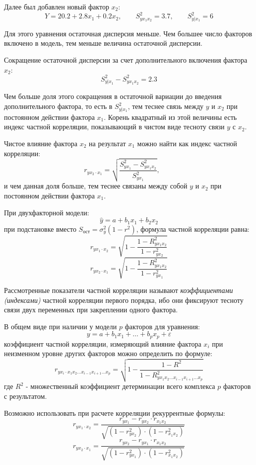 \documentclass[aps,%
12pt,%
final,%
oneside,
onecolumn,%
musixtex, %
superscriptaddress,%
centertags]{article} %
\theoremstyle{plain}
\theoremstyle{definition}
\theoremstyle{remark}
\begin{document}
Далее был добавлен новый фактор $x_2$:
$$ Y = 20.2 +2.8x_1+ 0.2x_2,\qquad S_{yx_1x_2}^2 = 3.7, \qquad S_{y|x_1}^2 = 6$$

Для этого уравнения остаточная дисперсия меньше. Чем большее число факторов включено в модель, тем меньше величина остаточной дисперсии.

Сокращение остаточной дисперсии за счет дополнительного включения фактора $x_2$:
$$S_{y|x_1}^2 - S_{yx_1x_2}^2 = 2.3$$

Чем больше доля этого сокращения в остаточной вариации до введения дополнительного фактора, то есть в $S_{y|x_1}^2$, тем теснее связь между $y$ и $x_2$ при постоянном действии фактора $x_1$. Корень квадратный из этой величины есть индекс частной корреляции, показывающий в чистом виде тесноту связи $y$ с $x_2$.

Чистое влияние фактора $x_2$ на результат $x_1$ можно найти как индекс частной корреляции:
$$ r_{yx_2\cdot x_1} = \sqrt{\frac{S_{yx_1}^2  - S_{yx_1x_2}^2}{S_{yx_1}^2}}, \qquad $$
и чем данная доля больше, тем теснее связаны между собой $y$ и $x_2$ при постоянном действии фактора $x_1$.

При двухфакторной модели:
$$ \hat{y} = a +b_1x_1 + b_2x_2$$
при подстановке вместо $S_{\text{ост}} = \sigma_y^2 (1-r^2)$, формула частной корреляции равна:
$$ r_{yx_1\cdot x_2} = \sqrt{1 - \frac{1 - R_{yx_1x_2}^2}{1-r_{yx_2}^2}}$$
$$ r_{yx_2\cdot x_1} = \sqrt{1 - \frac{1 - R_{yx_1x_2}^2}{1-r_{yx_1}^2}}$$

Рассмотренные показатели частной корреляции называют \textit{коэффициентами (индексами)} частной корреляции первого порядка, ибо они фиксируют тесноту связи двух переменных при закреплении одного фактора.

В общем виде при наличии у модели $p$ факторов для уравнения:
$$y = a + b_1x_1 + \ldots + b_px_p + \varepsilon$$
коэффициент частной корреляции, измеряющий влияние фактора $x_i$ при неизменном уровне других факторов можно определить по формуле:
$$r_{yx_i \cdot x_1x_2\ldots x_{i-1}x_{i+1}\ldots x_p} = \sqrt{1- \frac{1-R^2}{1-R_{y x_1x_2\ldots x_{i-1}x_{i+1}\ldots x_p}^2}}$$
где $R^2$ - множественный коэффициент детерминации всего комплекса $p$ факторов с результатом.

Возможно использовать при расчете корреляции рекуррентные формулы:
$$r_{yx_1 \cdot x_2} = \frac{r_{yx_1} -r_{yx_2}\cdot r_{x_1x_2} }{\sqrt{(1-r_{yx_2}^2)\cdot (1-r_{x_1x_2}^2)}} $$
$$r_{yx_2 \cdot x_1} = \frac{r_{yx_2} -r_{yx_1}\cdot r_{x_1x_2} }{\sqrt{(1-r_{yx_1}^2)\cdot (1-r_{x_1x_2}^2)}} $$
\end{document}
